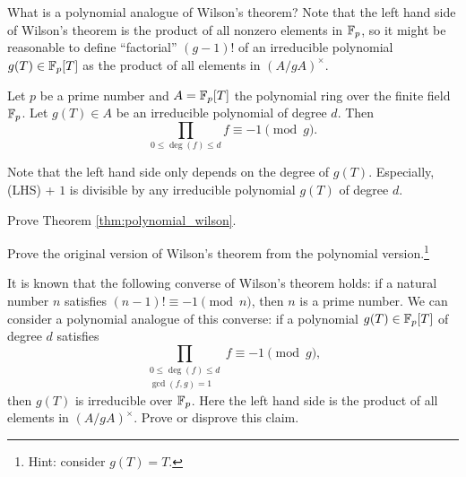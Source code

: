 What is a polynomial analogue of Wilson's theorem?
Note that the left hand side of Wilson's theorem is the product of all nonzero elements in $\mathbb{F}_p$, so it might be reasonable to define ``factorial'' $(g - 1)!$ of an irreducible polynomial $g(T) \in \mathbb{F}_p[T]$ as the product of all elements in $(A / gA)^\times$.

\begin{theorem}
    \label{thm:polynomial_wilson}
    Let $p$ be a prime number and $A = \mathbb{F}_p[T]$ the polynomial ring over the finite field $\mathbb{F}_p$.
    Let $g(T) \in A$ be an irreducible polynomial of degree $d$.
    Then
    \[
        \prod_{0 \le \deg(f) \le d} f \equiv -1 \pmod{g}.
    \]
\end{theorem}

Note that the left hand side only depends on the degree of $g(T)$.
Especially, (LHS) + $1$ is divisible by any irreducible polynomial $g(T)$ of degree $d$.

\begin{exercise}
    Prove Theorem \ref{thm:polynomial_wilson}.
\end{exercise}

\begin{exercise}
    Prove the original version of Wilson's theorem from the polynomial version.\footnote{Hint: consider $g(T) = T$.} 
\end{exercise}

\begin{exercise}
    It is known that the following converse of Wilson's theorem holds: if a natural number $n$ satisfies $(n - 1)! \equiv -1 \pmod{n}$, then $n$ is a prime number.
    We can consider a polynomial analogue of this converse: if a polynomial $g(T) \in \mathbb{F}_p[T]$ of degree $d$ satisfies
    \[
        \prod_{\substack{0 \le \deg(f) \le d \\ \gcd(f, g) = 1}} f \equiv -1 \pmod{g},
    \]
    then $g(T)$ is irreducible over $\mathbb{F}_p$.
    Here the left hand side is the product of all elements in $(A / gA)^\times$.
    Prove or disprove this claim.
\end{exercise}

\newpage
